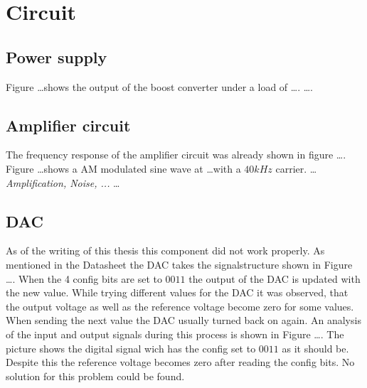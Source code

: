 \section{Circuit}

\subsection{Power supply}

Figure \dots shows the output of the boost converter under a load of \dots. \dots.

\subsection{Amplifier circuit}

The frequency response of the amplifier circuit was already shown in figure \dots. Figure \dots shows a AM modulated sine wave at \dots with a $40kHz$ carrier. \dots \textit{Amplification, Noise, ...} \dots

\subsection{DAC}\label{sec:meas:circuit:dac}

As of the writing of this thesis this component did not work properly. As mentioned in the Datasheet the DAC takes the signalstructure shown in Figure \dots. When the 4 config bits are set to $0011$ the output of the DAC is updated with the new value.
While trying different values for the DAC it was observed, that the output voltage as well as the reference voltage become zero for some values. When sending the next value the DAC usually turned back on again. An analysis of the input and output signals during this process is shown in Figure \dots.\p
The picture shows the digital signal wich has the config set to $0011$ as it should be. Despite this the reference voltage becomes zero after reading the config bits. No solution for this problem could be found.